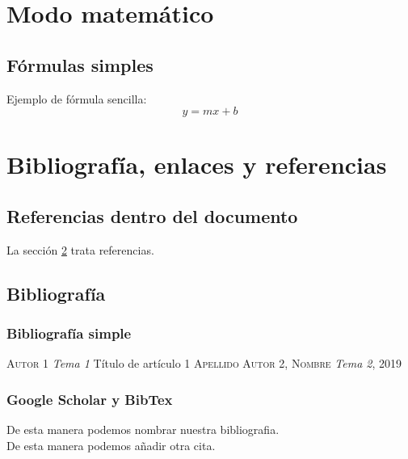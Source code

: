 \documentclass{article}
\begin{document}
\section{Modo matemático}
\subsection{Fórmulas simples}
Ejemplo de fórmula sencilla:
\[
y=mx+b
\]
\newpage
\section{Bibliografía, enlaces y referencias} \label{sec:Seccion 1}
\subsection{Referencias dentro del documento} 
\begin{flushleft}
La sección \ref{sec:Seccion 1} trata referencias.
\end{flushleft}
\subsection{Bibliografía}
\subsubsection{Bibliografía simple}
\begin{thebibliography}{}
\textsc{Autor 1}
\textit{Tema 1} Título de artículo 1
\textsc{Apellido Autor 2, Nombre}
\textit{Tema 2}, 2019
\end{thebibliography}
\subsubsection{Google Scholar y BibTex}
\noindent 
De esta manera podemos nombrar nuestra bibliografia\cite{wood2014ethereum}. \\
De esta manera podemos añadir otra cita\cite{mian2013provisioning}.


\end{document}

